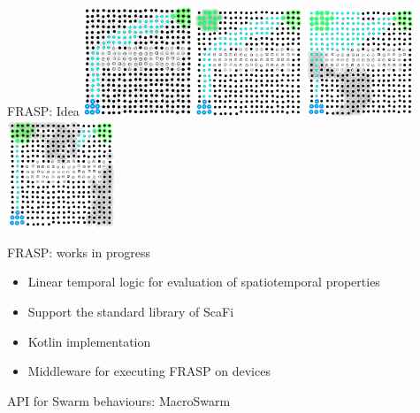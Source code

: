\documentclass[presentation, 9pt, aspectratio=169]{beamer}\mode<presentation>{\usetheme{AMSBolognaFC}}
\begin{document}
\begin{frame}{FRASP: Idea}
	\includegraphics[width=0.24\textwidth]{img/start.png}
	\includegraphics[width=0.24\textwidth]{img/middle.png}
	\includegraphics[width=0.24\textwidth]{img/middle-2.png}
	\includegraphics[width=0.24\textwidth]{img/end.png}
\end{frame}
\begin{frame}{FRASP: works in progress}
	\begin{exampleblock}
		
	\begin{itemize}
		\item Linear temporal logic for evaluation of spatiotemporal properties
		\item Support the standard library of ScaFi
		\item Kotlin implementation
		\item Middleware for executing FRASP on devices
	\end{itemize}
	\end{exampleblock}
\end{frame}
\begin{frame}{API for Swarm behaviours: MacroSwarm}

\end{frame}
\end{document}
